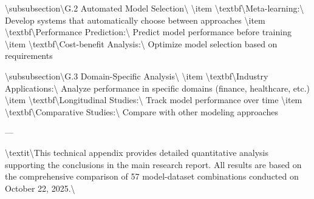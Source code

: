 \documentclass[11pt,a4paper]{article}
\begin{document}
\textbackslash{}subsubsection\textbackslash{}{G.2 Automated Model Selection\textbackslash{}}
\textbackslash{}item \textbackslash{}textbf\textbackslash{}{Meta-learning:\textbackslash{}} Develop systems that automatically choose between approaches
\textbackslash{}item \textbackslash{}textbf\textbackslash{}{Performance Prediction:\textbackslash{}} Predict model performance before training
\textbackslash{}item \textbackslash{}textbf\textbackslash{}{Cost-benefit Analysis:\textbackslash{}} Optimize model selection based on requirements

\textbackslash{}subsubsection\textbackslash{}{G.3 Domain-Specific Analysis\textbackslash{}}
\textbackslash{}item \textbackslash{}textbf\textbackslash{}{Industry Applications:\textbackslash{}} Analyze performance in specific domains (finance, healthcare, etc.)
\textbackslash{}item \textbackslash{}textbf\textbackslash{}{Longitudinal Studies:\textbackslash{}} Track model performance over time
\textbackslash{}item \textbackslash{}textbf\textbackslash{}{Comparative Studies:\textbackslash{}} Compare with other modeling approaches

---

\textbackslash{}textit\textbackslash{}{This technical appendix provides detailed quantitative analysis supporting the conclusions in the main research report. All results are based on the comprehensive comparison of 57 model-dataset combinations conducted on October 22, 2025.\textbackslash{}}
\end{document}
